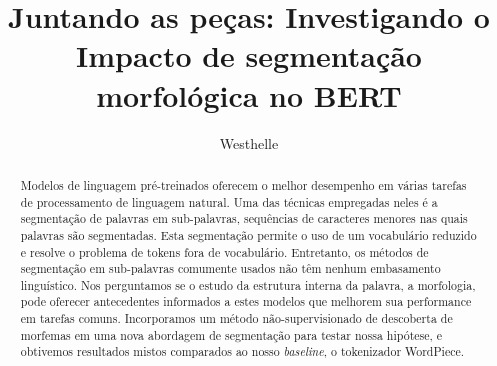 \documentclass[cic,tc]{iiufrgs}
\title{Juntando as peças: Investigando o Impacto de segmentação morfológica no BERT}
\author{Westhelle}{Matheus}
\begin{document}
\maketitle





\begin{abstract}
    Modelos de linguagem pré-treinados oferecem o melhor desempenho em várias tarefas de processamento de linguagem natural. Uma das técnicas empregadas neles é a segmentação de palavras em sub-palavras, sequências de caracteres menores nas quais palavras são segmentadas. Esta segmentação permite o uso de um vocabulário reduzido e resolve o problema de tokens fora de vocabulário. Entretanto, os métodos de segmentação em sub-palavras comumente usados não têm nenhum embasamento linguístico. Nos perguntamos se o estudo da estrutura interna da palavra, a morfologia, pode oferecer antecedentes informados a estes modelos que melhorem sua performance em tarefas comuns. Incorporamos um método não-supervisionado de descoberta de morfemas em uma nova abordagem de segmentação para testar nossa hipótese, e obtivemos resultados mistos comparados ao nosso \emph{baseline}, o tokenizador WordPiece.
\end{abstract}
\end{document}
